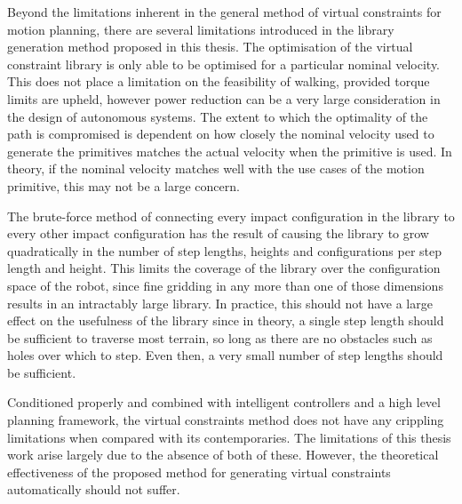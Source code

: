 Beyond the limitations inherent in the general method of virtual constraints for motion planning, there are several limitations introduced in the library generation method proposed in this thesis. The optimisation of the virtual constraint library is only able to be optimised for a particular nominal velocity. This does not place a limitation on the feasibility of walking, provided torque limits are upheld, however power reduction can be a very large consideration in the design of autonomous systems. The extent to which the optimality of the path is compromised is dependent on how closely the nominal velocity used to generate the primitives matches the actual velocity when the primitive is used. In theory, if the nominal velocity matches well with the use cases of the motion primitive, this may not be a large concern.

The brute-force method of connecting every impact configuration in the library to every other impact configuration has the result of causing the library to grow quadratically in the number of step lengths, heights and configurations per step length and height. This limits the coverage of the library over the configuration space of the robot, since fine gridding in any more than one of those dimensions results in an intractably large library. In practice, this should not have a large effect on the usefulness of the library since in theory, a single step length should be sufficient to traverse most terrain, so long as there are no obstacles such as holes over which to step. Even then, a very small number of step lengths should be sufficient.

Conditioned properly and combined with intelligent controllers and a high level planning framework, the virtual constraints method does not have any crippling limitations when compared with its contemporaries. The limitations of this thesis work arise largely due to the absence of both of these. However, the theoretical effectiveness of the proposed method for generating virtual constraints automatically should not suffer.